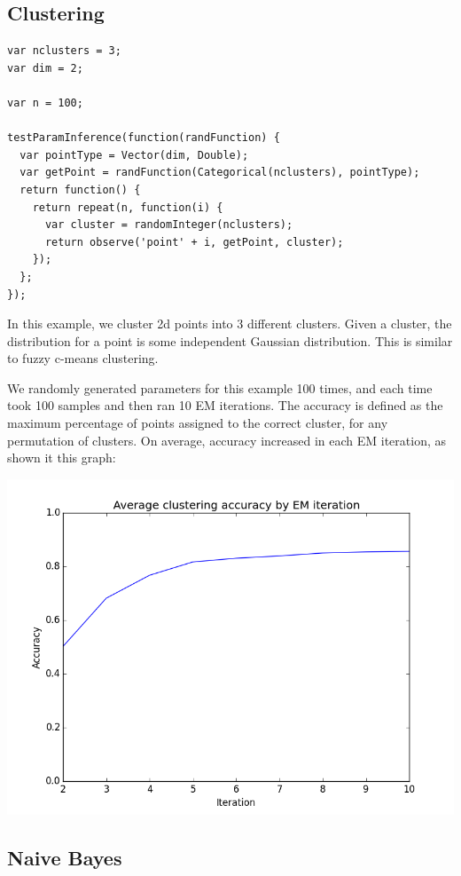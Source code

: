 \documentclass{article}
\begin{document}
  \subsection{Clustering}
{\small
\begin{verbatim}
var nclusters = 3;
var dim = 2;

var n = 100;

testParamInference(function(randFunction) {
  var pointType = Vector(dim, Double);
  var getPoint = randFunction(Categorical(nclusters), pointType);
  return function() {
    return repeat(n, function(i) {
      var cluster = randomInteger(nclusters);
      return observe('point' + i, getPoint, cluster);
    });
  };
});
\end{verbatim}
}

In this example, we cluster 2d points into 3 different clusters.  Given a cluster, the distribution for a point is some independent Gaussian distribution.  This is similar to fuzzy c-means clustering.

We randomly generated parameters for this example 100 times, and each time took 100 samples and then ran 10 EM iterations.  The accuracy is defined as the maximum percentage of points assigned to the correct cluster, for any permutation of clusters.  On average, accuracy increased in each EM iteration, as shown it this graph:

\begin{center}
\includegraphics[scale=0.4]{cluster_accuracy.png}
\end{center}

\subsection{Naive Bayes}
\end{document}
